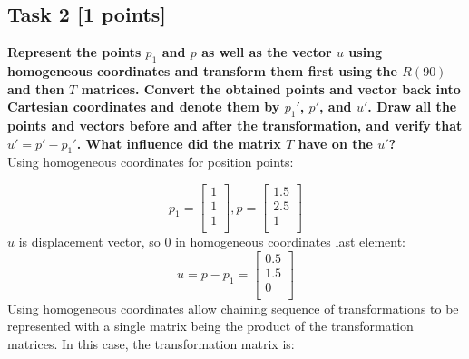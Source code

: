 \documentclass{article}
\begin{document}
\subsection*{Task 2 [1 points]}
\textbf{Represent the points $p_1$ and $p$ as well as the vector $u$ using homogeneous coordinates and
    transform them first using the $R(90)$ and then $T$ matrices.
    Convert the obtained points and vector back into Cartesian coordinates and denote them by
    $p_1'$, $p'$, and $u'$.
    Draw all the points and vectors before and after the transformation,
    and verify that $u' = p' - p_1'$.
    What influence did the matrix $T$ have on the $u'$?}
\\\newline
Using homogeneous coordinates for position points:

\[
    p_1 =
    \begin{bmatrix}
        1 \\ 1 \\ 1 \\
    \end{bmatrix}
    , p =
    \begin{bmatrix}
        1.5 \\ 2.5 \\ 1 \\
    \end{bmatrix}
\]
$u$ is displacement vector, so $0$ in homogeneous coordinates last element:
\[
    u = p - p_1 =
    \begin{bmatrix}
        0.5 \\ 1.5 \\ 0 \\
    \end{bmatrix}
\]
Using homogeneous coordinates allow chaining sequence of transformations to be represented
with a single matrix being the product of the transformation matrices.
In this case, the transformation matrix is:
\end{document}

